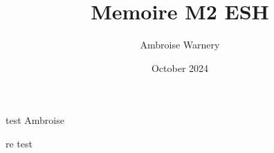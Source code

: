 \documentclass[a4paper,12pt,twoside,french]{book}
\title{Memoire M2 ESH}
\author{Ambroise Warnery}
\date{October 2024}
\begin{document}
test Ambroise

re test
\end{document}
